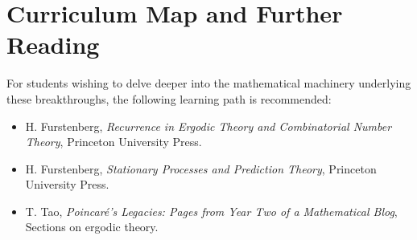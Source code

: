 \section{Curriculum Map and Further Reading}
For students wishing to delve deeper into the mathematical machinery underlying these breakthroughs, the following learning path is recommended:
\begin{itemize}
  \item H. Furstenberg, \emph{Recurrence in Ergodic Theory and Combinatorial Number Theory}, Princeton University Press.
  \item H. Furstenberg, \emph{Stationary Processes and Prediction Theory}, Princeton University Press.
  \item T. Tao, \emph{Poincar\'e's Legacies: Pages from Year Two of a Mathematical Blog}, Sections on ergodic theory.
\end{itemize}


